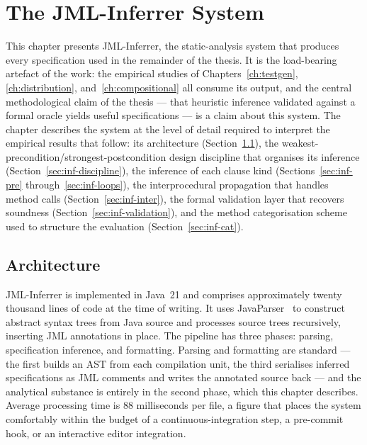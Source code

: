 \chapter{The JML-Inferrer System}
\label{ch:inference}

This chapter presents JML-Inferrer, the static-analysis system that produces
every specification used in the remainder of the thesis. It is the
load-bearing artefact of the work: the empirical studies of
Chapters~\ref{ch:testgen}, \ref{ch:distribution}, and~\ref{ch:compositional}
all consume its output, and the central methodological claim of the thesis ---
that heuristic inference validated against a formal oracle yields useful
specifications --- is a claim about this system. The chapter describes the
system at the level of detail required to interpret the empirical results that
follow: its architecture (Section~\ref{sec:inf-arch}), the
weakest-precondition/strongest-postcondition design discipline that organises
its inference (Section~\ref{sec:inf-discipline}), the inference of each clause
kind (Sections~\ref{sec:inf-pre} through~\ref{sec:inf-loops}), the
interprocedural propagation that handles method calls
(Section~\ref{sec:inf-inter}), the formal validation layer that recovers
soundness (Section~\ref{sec:inf-validation}), and the method categorisation
scheme used to structure the evaluation (Section~\ref{sec:inf-cat}).

\section{Architecture}
\label{sec:inf-arch}

JML-Inferrer is implemented in Java~21 and comprises approximately twenty
thousand lines of code at the time of writing. It uses
JavaParser~\cite{javaparser} to construct abstract syntax trees from Java
source and processes source trees recursively, inserting JML annotations in
place. The pipeline has three phases: parsing, specification inference, and
formatting. Parsing and formatting are standard --- the first builds an AST
from each compilation unit, the third serialises inferred specifications as
JML comments and writes the annotated source back --- and the analytical
substance is entirely in the second phase, which this chapter describes.
Average processing time is 88 milliseconds per file, a figure that places the
system comfortably within the budget of a continuous-integration step, a
pre-commit hook, or an interactive editor integration.

